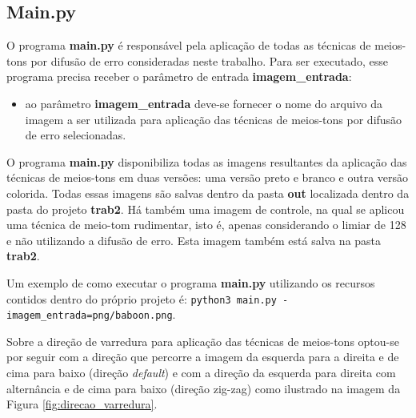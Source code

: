 \documentclass{article}
\begin{document}
%
\subsection{Main.py}
O programa \textbf{main.py} é responsável pela aplicação de todas as técnicas de meios-tons por difusão de erro consideradas neste trabalho. Para ser executado, esse programa precisa receber o parâmetro de entrada \textbf{imagem\_entrada}:

\begin{itemize}
	\item ao parâmetro \textbf{imagem\_entrada} deve-se fornecer o nome do arquivo da imagem a ser utilizada para aplicação das técnicas de meios-tons por difusão de erro selecionadas.
\end{itemize}
	
\noindent 
O programa \textbf{main.py} disponibiliza todas as imagens resultantes da aplicação das técnicas de meios-tons em duas versões: uma versão preto e branco e outra versão colorida. Todas essas imagens são salvas dentro da pasta \textbf{out} localizada dentro da pasta do projeto \textbf{trab2}. Há também uma imagem de controle, na qual se aplicou uma técnica de meio-tom rudimentar, isto é, apenas considerando o limiar de 128 e não utilizando a difusão de erro. Esta imagem também está salva na pasta \textbf{trab2}.

Um exemplo de como executar o programa \textbf{main.py} utilizando os recursos contidos dentro do próprio projeto é: \lstinline{python3 main.py -imagem_entrada=png/baboon.png}.

Sobre a direção de varredura para aplicação das técnicas de meios-tons optou-se por seguir com a direção que percorre a imagem da esquerda para a direita e de cima para baixo (direção \textit{default}) e com a direção da esquerda para direita com alternância e de cima para baixo (direção zig-zag) como ilustrado na imagem da Figura \ref{fig:direcao_varredura}.
\end{document}
